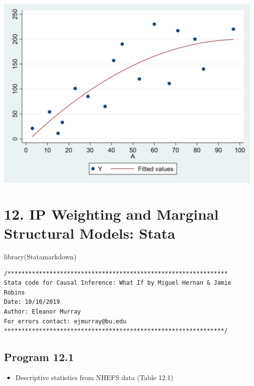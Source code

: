 \documentclass[
  10pt,
]{book}
\newenvironment{Shaded}{\begin{snugshade}}{\end{snugshade}}
\newcommand{\FunctionTok}[1]{\textcolor[rgb]{0.00,0.00,0.00}{#1}}
\newcommand{\NormalTok}[1]{#1}
\providecommand{\tightlist}{%
  \setlength{\itemsep}{0pt}\setlength{\parskip}{0pt}}
\begin{document}
\begin{center}\includegraphics[width=0.85\linewidth]{figs/stata-fig-11-5} \end{center}

\hypertarget{ip-weighting-and-marginal-structural-models-stata}{%
\chapter*{12. IP Weighting and Marginal Structural Models: Stata}\label{ip-weighting-and-marginal-structural-models-stata}}

\begin{Shaded}
\begin{Highlighting}[]
\FunctionTok{library}\NormalTok{(Statamarkdown)}
\end{Highlighting}
\end{Shaded}

\begin{verbatim}
/***************************************************************
Stata code for Causal Inference: What If by Miguel Hernan & Jamie Robins
Date: 10/10/2019
Author: Eleanor Murray 
For errors contact: ejmurray@bu.edu
***************************************************************/
\end{verbatim}

\hypertarget{program-12.1-1}{%
\section{Program 12.1}\label{program-12.1-1}}

\begin{itemize}
\tightlist
\item
  Descriptive statistics from NHEFS data (Table 12.1)
\end{itemize}
\end{document}
